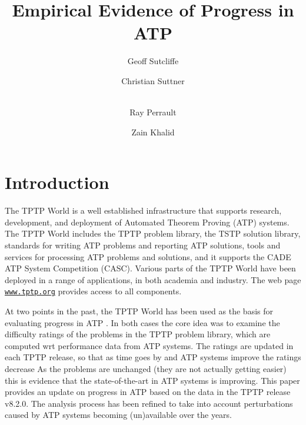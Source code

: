 \documentclass[runningheads]{llncs}
\begin{document}
\title{Empirical Evidence of Progress in ATP}

\author{
Geoff Sutcliffe
\and
Christian Suttner
\and \\
Ray Perrault\orcidID{}
\and
Zain Khalid
}

\maketitle
\begin{abstract}

\end{abstract}
\section{Introduction}
\label{Introduction}

The TPTP World \cite{Sut17} is a well established infrastructure that supports research, 
development, and deployment of Automated Theorem Proving (ATP) systems.
The TPTP World includes the TPTP problem library,
the TSTP solution library,
standards for writing ATP problems and reporting ATP solutions,
tools and services for processing ATP problems and solutions,
and it supports the CADE ATP System Competition (CASC).
Various parts of the TPTP World have been deployed in a range of applications,
in both academia and industry.
The web page \href{https://www.tptp.org}{\tt www.tptp.org} provides access to all 
components.

At two points in the past, the TPTP World has been used as the basis for evaluating progress
in ATP \cite{SFS01,SSP21}.
In both cases the core idea was to examine the difficulty ratings of the problems in the TPTP 
problem library, which are computed wrt performance data from ATP systems.
The ratings are updated in each TPTP release, so that as time goes by and ATP systems improve 
the ratings decrease
As the problems are unchanged (they are not actually getting easier) this is evidence that 
the state-of-the-art in ATP systems is improving.
This paper provides an update on progress in ATP based on the data in the TPTP release v8.2.0.
The analysis process has been refined to take into account perturbations caused by ATP systems
becoming (un)available over the years.
\end{document}
